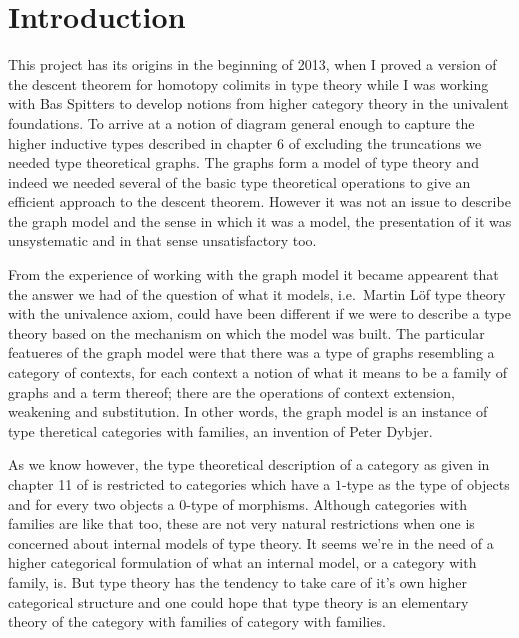 \section{Introduction}
This project has its origins in the beginning of 2013, when I proved a version
of the descent theorem for homotopy colimits in type theory while I was working
with Bas Spitters to develop notions from higher category theory in the
univalent foundations. To arrive at a
notion of diagram general enough to capture the higher inductive types described
in chapter 6 of \cite{TheBook} excluding the truncations we needed type
theoretical graphs. The graphs form a model of type theory and indeed we needed
several of the basic type theoretical operations to give an efficient approach
to the descent theorem. However it was not an issue to describe the graph model
and the sense in which it was a model, the presentation of it was unsystematic
and in that sense unsatisfactory too. 

From the experience of working with the graph model it became appearent that the
answer we had of the question of what it models, i.e.~Martin L\"of type theory
with the univalence axiom, could have been different if we were to describe a
type theory based on the mechanism on which the model was built. The particular
featueres of the graph model were that there was a type of graphs resembling a category
of contexts, for each context a notion of what it means to be a family of graphs
and a term thereof; there are the operations of context extension, weakening and
substitution. In other words, the graph model is an instance of type theretical
categories with families, an invention of Peter Dybjer.

As we know however, the type theoretical description of a category as given in
chapter 11 of \cite{TheBook} is restricted to categories which have a $1$-type
as the type of objects and for every two objects a $0$-type of morphisms.
Although categories with families are like that too, these are not very natural
restrictions when one is concerned about internal models of type theory. It
seems we're in the need of a higher categorical formulation of what an internal
model, or a category with family, is. But type theory has the tendency to take
care of it's own higher categorical structure and one could hope that type
theory is an elementary theory of the category with families of category with
families.


